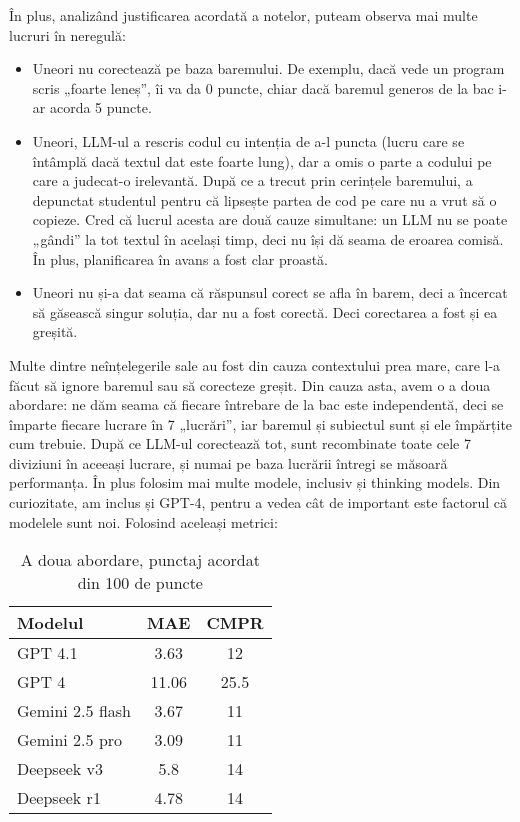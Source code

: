 \documentclass[12pt, a4paper]{report}
\begin{document}
În plus, analizând justificarea acordată a notelor, puteam observa mai multe lucruri în neregulă:
\begin{itemize}
  \item Uneori nu corectează pe baza baremului. De exemplu, dacă vede un program scris „foarte leneș”, îi va da 0 puncte, chiar dacă baremul generos de la bac i-ar acorda 5 puncte.
  \item Uneori, LLM-ul a rescris codul cu intenția de a-l puncta (lucru care se întâmplă dacă textul dat este foarte lung), dar a omis o parte a codului pe care 
  a judecat-o irelevantă. După ce a trecut prin cerințele baremului, a depunctat studentul pentru că lipsește partea de cod pe care nu a vrut să o copieze.
  Cred că lucrul acesta are două cauze simultane: un LLM nu se poate „gândi” la tot textul în același timp, deci nu își dă seama de eroarea comisă. În plus, planificarea în avans a fost clar proastă.
  \item Uneori nu și-a dat seama că răspunsul corect se afla în barem, deci a încercat să găsească singur soluția, dar nu a fost corectă. Deci corectarea a fost și ea greșită.
\end{itemize}


Multe dintre neînțelegerile sale au fost din cauza contextului prea mare, care l-a făcut să ignore baremul sau să corecteze greșit.  
Din cauza asta, avem o a doua abordare: ne dăm seama că fiecare întrebare de la bac este independentă, deci se împarte fiecare lucrare în 7 „lucrări”, iar baremul și subiectul
sunt și ele împărțite cum trebuie. După ce LLM-ul corectează tot, sunt 
recombinate toate cele 7 diviziuni în aceeași lucrare, și numai pe baza lucrării întregi se măsoară performanța. În plus folosim mai multe modele, inclusiv și thinking models. Din curiozitate, am inclus și GPT-4, pentru a vedea cât de important este factorul că modelele sunt noi.  
Folosind aceleași metrici:


\begin{table}[h!]
\centering
\begin{tabular}{|l|c|c|}
\hline
\textbf{Modelul} & \textbf{MAE} & \textbf{CMPR} \\
\hline
GPT 4.1 & 3.63 & 12\\

\hline
GPT 4 & 11.06 & 25.5 \\
\hline
Gemini 2.5 flash & 3.67 & 11\\


\hline
Gemini 2.5 pro & 3.09 & 11\\
\hline
Deepseek v3  & 5.8 & 14 \\

\hline
Deepseek r1 & 4.78 & 14 
\\
\hline

\end{tabular}
\caption{A doua abordare, punctaj acordat din 100 de puncte}

\end{table}
\end{document}
